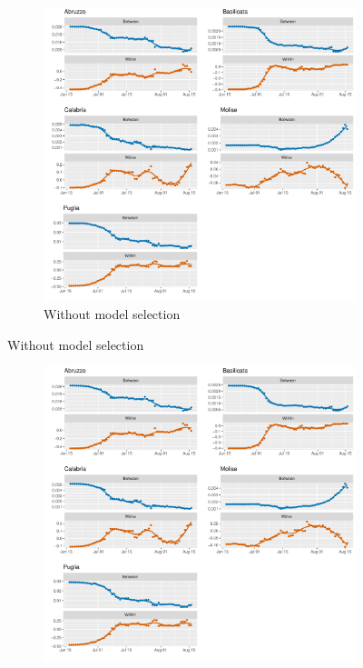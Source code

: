 \documentclass[12pt]{article}
\begin{document}
\begin{appendices}
		\begin{figure}[H]
    	    \centering
    	    \begin{subfigure}{\textwidth}
    	      \centering
    	      \includegraphics[width=\linewidth]{output/model_between_lag14_betas_Sud_rolling.pdf}
    	      \caption{Without model selection}
    	      \label{fig:beta_between_over_time_sud_regular}
    	    \end{subfigure}
        \end{figure}
        \begin{figure}[H]\ContinuedFloat
    	    \begin{subfigure}{\textwidth}
    	      \centering
    	      \includegraphics[width=\linewidth]{output/model_between_lag14_betas_Sud_aic_rolling.pdf}

\end{subfigure}
\end{figure}
\end{appendices}
\end{document}
